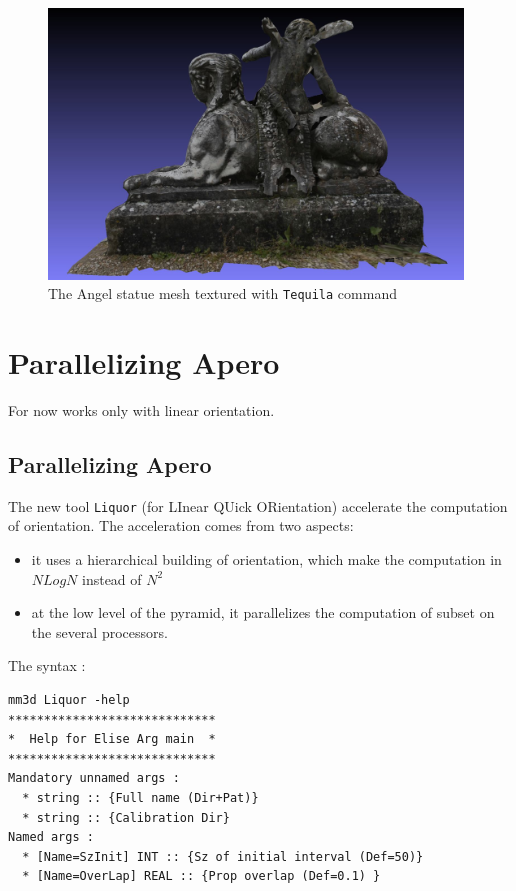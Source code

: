 \begin{figure}[H]
\begin{center}
\includegraphics[width=110mm]{FIGS/Ange/Tequila.jpg}
\end{center}
\caption{The Angel statue mesh textured with {\tt Tequila} command}
\label{FIG:Angel:Tequila}
\end{figure}

\section{Parallelizing Apero}

For now works only with linear orientation.

\subsection{Parallelizing Apero}

The new tool {\tt Liquor} (for LInear QUick ORientation) accelerate the computation of orientation. The acceleration comes
from two aspects:

\begin{itemize}
   \item  it uses a hierarchical building of orientation, which make the computation in $N Log N$ instead of $N^2$
   \item  at the low level of the pyramid, it parallelizes the computation of subset on the several processors.
\end{itemize}

The syntax :

\begin{verbatim}
mm3d Liquor -help
*****************************
*  Help for Elise Arg main  *
*****************************
Mandatory unnamed args :
  * string :: {Full name (Dir+Pat)}
  * string :: {Calibration Dir}
Named args :
  * [Name=SzInit] INT :: {Sz of initial interval (Def=50)}
  * [Name=OverLap] REAL :: {Prop overlap (Def=0.1) }
\end{verbatim}

